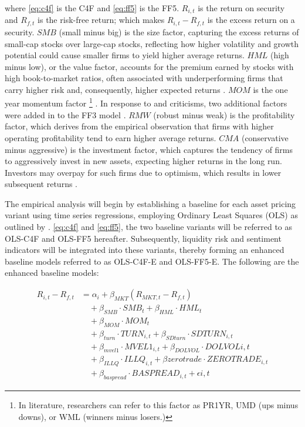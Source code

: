 where \cref{eq:c4f} is the C4F and \cref{eq:ff5} is the FF5. $R_{i,t}$ is the return on security and $R_{f,t}$ is the risk-free return; which makes $R_{i,t} - R_{f,t}$ is the excess return on a security. $SMB$ (small minus big) is the size factor, capturing the excess returns of small-cap stocks over large-cap stocks, reflecting how higher volatility and growth potential could cause smaller firms to yield higher average returns. $HML$ (high minus low), or the value factor, accounts for the premium earned by stocks with high book-to-market ratios, often associated with underperforming firms that carry higher risk and, consequently, higher expected returns \cite{ff3_1993}. $MOM$ is the one year momentum factor \footnote{In literature, researchers can refer to this factor as PR1YR, UMD (ups minus downs), or WML (winners minus losers.)} \cite{cahart_1997}. In response to  and  criticisms, two additional factors were added in to the FF3 model \cite{ff5_2015}. $RMW$ (robust minus weak) is the profitability factor, which derives from the empirical observation that firms with higher operating profitability tend to earn higher average returns. $CMA$ (conservative minus aggressive) is the investment factor, which captures the tendency of firms to aggressively invest in new assets, expecting higher returns in the long run. Investors may overpay for such firms due to optimism, which results in lower subsequent returns \cite{titman_2004}.

The empirical analysis will begin by establishing a baseline for each asset pricing variant using time series regressions, employing Ordinary Least Squares (OLS) as outlined by . \cref{eq:c4f} and \cref{eq:ff5}, the two baseline variants will be referred to as OLS-C4F and OLS-FF5 hereafter. Subsequently, liquidity risk and sentiment indicators will be integrated into these variants, thereby forming an enhanced baseline models referred to as OLS-C4F-E and OLS-FF5-E. The following are the enhanced baseline models:

\begin{equation}
    \label{eq:c4f_expanded}
    \begin{split}
    R_{i,t} - R_{f,t} &= \alpha_i + \beta_{MKT} (R_{MKT,t} - R_{f,t}) \\
    &\quad + \beta_{SMB} \cdot SMB_t + \beta_{HML} \cdot HML_t \\
    &\quad + \beta_{MOM} \cdot MOM_t \\
    &\quad + \beta_{turn} \cdot TURN_{i,t} + \beta_{SDturn} \cdot SDTURN_{i,t} \\
    &\quad + \beta_{mvel1} \cdot MVEL1_{i,t} + \beta_{DOLVOL} \cdot DOLVOL{i,t} \\
    &\quad + \beta_{ILLQ} \cdot ILLQ_{i,t} + \beta{zerotrade} \cdot ZEROTRADE_{i,t} \\
    &\quad + \beta_{baspread} \cdot BASPREAD_{i,t} + \epsilon{i,t}
    \end{split}
\end{equation}

